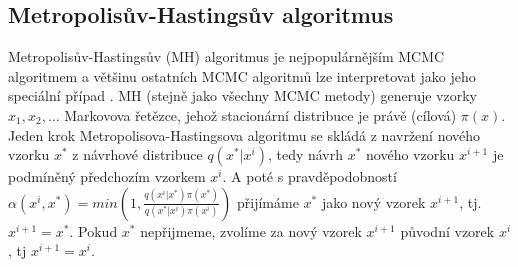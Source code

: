\documentclass[czech,master,public,dept470,male,cpdeclaration,oneside, python]{diploma}
\begin{document}
\subsection{Metropolisův-Hastingsův algoritmus}
Metropolisův-Hastingsův (MH) algoritmus je nejpopulárnějším MCMC algoritmem a většinu ostatních MCMC algoritmů lze interpretovat jako jeho speciální případ \cite{robert2004monte}. MH (stejně jako všechny MCMC metody) generuje vzorky $x_1, x_2, ...$ Markovova řetězce, jehož stacionární distribuce je právě (cílová) $\pi(x)$. Jeden krok Metropolisova-Hastingsova algoritmu se skládá z navržení nového vzorku $x^{*}$ z  návrhové distribuce $q(x^{*} | x^i)$, tedy návrh $x^{*}$ nového vzorku $x^{i+1}$ je podmíněný předchozím vzorkem $x^i$. A poté s pravděpodobností  $\alpha(x^i, x^{*}) = min(1, \frac{q(x^i | x^{*})\pi(x^{*})}{q(x^{*} | x^i)\pi(x^i)})$ přijímáme $x^{*}$ jako nový vzorek $x^{i+1}$, tj. $x^{i+1} = x^*$. Pokud $x^*$ nepřijmeme, zvolíme za nový vzorek $x^{i+1}$ původní vzorek $x^i$, tj $x^{i+1} = x^i$. \par 
\end{document}
